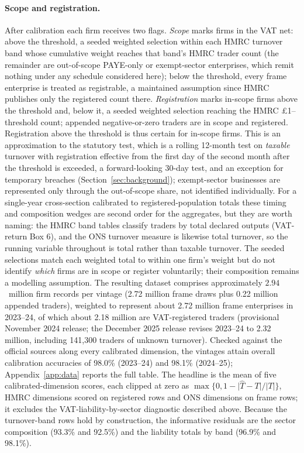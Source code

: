 \paragraph{Scope and registration.} After calibration each firm receives two
flags. \emph{Scope} marks firms in the VAT net: above the threshold, a seeded
weighted selection within each HMRC turnover band whose cumulative weight
reaches that band's HMRC trader count (the remainder are out-of-scope
PAYE-only or exempt-sector enterprises, which remit nothing under any schedule
considered here); below the threshold, every frame enterprise is treated as
registrable, a maintained assumption since HMRC publishes only the registered
count there. \emph{Registration} marks in-scope firms above the threshold and,
below it, a seeded weighted selection reaching the HMRC \pounds1--threshold
count; appended negative-or-zero traders are in scope and registered.
Registration above the threshold is thus certain for in-scope firms. This is an
approximation to the statutory test, which is a
rolling 12-month test on \emph{taxable} turnover with registration effective
from the first day of the second month after the threshold is exceeded, a forward-looking 30-day test, and an exception for temporary
breaches (Section~\ref{sec:background}); exempt-sector businesses are
represented only through the out-of-scope share, not identified individually.
For a single-year cross-section calibrated to registered-population totals these
timing and composition wedges are second order for the aggregates, but they are
worth naming: the HMRC band tables classify traders by total declared outputs
(VAT-return Box 6), and the ONS turnover measure is likewise total turnover, so
the running variable throughout is total rather than taxable turnover. The
seeded selections match each weighted total to within one firm's weight but do
not identify \emph{which} firms are in scope or register voluntarily; their
composition remains a modelling assumption. The resulting dataset comprises
approximately $2.94$~million firm records per vintage (2.72 million frame
draws plus 0.22 million appended traders), weighted to represent
about 2.72 million frame enterprises in 2023--24, of which about 2.18 million are
VAT-registered traders (provisional November 2024 release; the December 2025
release revises 2023--24 to 2.32 million, including 141{,}300 traders of
unknown turnover). Checked against the official sources along every
calibrated dimension, the vintages attain overall calibration accuracies of
98.0\% (2023--24) and 98.1\% (2024--25);
Appendix~\ref{app:data} reports the full table. The headline is the mean of
five calibrated-dimension scores, each clipped at zero as
$\max\{0,1-\lvert \widehat{T}-T\rvert/\lvert T\rvert\}$, HMRC dimensions
scored on registered rows and ONS dimensions on frame rows; it excludes the
VAT-liability-by-sector diagnostic described above. Because the turnover-band
rows hold by construction, the informative residuals are the sector
composition (93.3\% and 92.5\%) and the liability totals by band
(96.9\% and 98.1\%).

